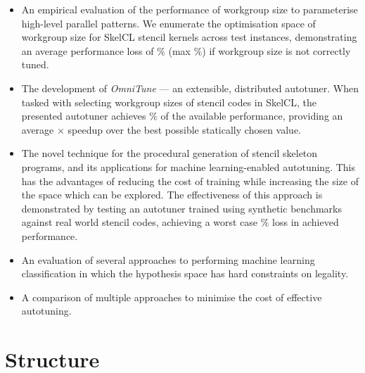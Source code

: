 \begin{itemize}
\item An empirical evaluation of the performance of workgroup size to
  parameterise high-level parallel patterns. We enumerate the
  optimisation space of workgroup size for SkelCL stencil kernels
  across  test instances, demonstrating
  an average performance loss of
  $\%$ (max
  $\%$) if workgroup size is not
  correctly tuned. 
\item The development of \emph{OmniTune} --- an extensible,
  distributed autotuner. When tasked with selecting workgroup sizes of
  stencil codes in SkelCL, the presented autotuner achieves
  $\%$ of the available
  performance, providing an average
  $\times$ speedup over the
  best possible statically chosen value.
\item The novel technique for the procedural generation of stencil
  skeleton programs, and its applications for machine learning-enabled
  autotuning. This has the advantages of reducing the cost of training
  while increasing the size of the space which can be explored. The
  effectiveness of this approach is demonstrated by testing an
  autotuner trained using synthetic benchmarks against
   real world stencil codes, achieving a
  worst case
  $\%$
  loss in achieved performance.
\item An evaluation of several approaches to performing machine
  learning classification in which the hypothesis space has hard
  constraints on legality.
\item A comparison of multiple approaches to minimise the cost of
  effective autotuning. 
\end{itemize}

\section{Structure}

